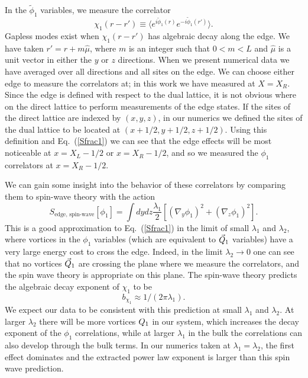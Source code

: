 In the $\tilde{\phi}_1$ variables, we measure the correlator
\begin{equation}
\chi_1(r-r')\equiv\langle e^{i\tilde{\phi}_1(r)}e^{-i\tilde{\phi}_1(r')}\rangle.
\label{Crr2}
\end{equation}
Gapless modes exist when $\chi_1(r-r')$ has algebraic decay along the edge. We have taken $r'=r+m\hat{\mu}$, where $m$ is an integer such that $0<m<L$ and $\hat{\mu}$ is a unit vector in either the $y$ or $z$ directions. When we present numerical data we have averaged over all directions and all sites on the edge. We can choose either edge to measure the correlators at; in this work we have measured at $X=X_R$.  Since the edge is defined with respect to the dual lattice, it is not obvious where on the direct lattice to perform measurements of the edge states.  If the sites of the direct lattice are indexed by $(x,y,z)$, in our numerics we defined the sites of the dual lattice to be located at $(x+1/2,y+1/2,z+1/2)$. Using this definition and Eq.~(\ref{Sfrac1}) we can see that the edge effects will be most noticeable at $x=X_L-1/2$ or $x=X_R-1/2$, and so we measured the $\phi_1$ correlators at $x=X_R-1/2$. 

We can gain some insight into the behavior of these correlators by comparing them to spin-wave theory with the action
\begin{equation*}
S_{\text{edge, spin-wave}}[\phi_1]=\int dydz \frac{\lambda_1}{2}\left[ (\nabla_y \phi_1)^2+(\nabla_z \phi_1)^2 \right].
\end{equation*}
This is a good approximation to Eq.~(\ref{Sfrac1}) in the limit of small $\lambda_1$ and $\lambda_2$, where vortices in the $\phi_1$ variables (which are equivalent to $\vec{Q}_1$ variables) have a very large energy cost to cross the edge. Indeed, in the limit $\lambda_2\rightarrow0$ one can see that no vortices $\vec{Q}_1$ are crossing the plane where we measure the correlators, and the spin wave theory is appropriate on this plane. The spin-wave theory predicts the algebraic decay exponent of $\chi_1$ to be 
\begin{equation}
b_{\chi_1} \approx 1/(2\pi\lambda_1).
\label{bchi1_sw}
\end{equation}
We expect our data to be consistent with this prediction at small $\lambda_1$ and $\lambda_2$. At larger $\lambda_2$ there will be more vortices $Q_1$ in our system, which increases the decay exponent of the $\phi_1$ correlations, while at larger $\lambda_1$ in the bulk the correlations can also develop through the bulk terms. In our numerics taken at $\lambda_1 = \lambda_2$, the first effect dominates and the extracted power law exponent is larger than this spin wave prediction.

